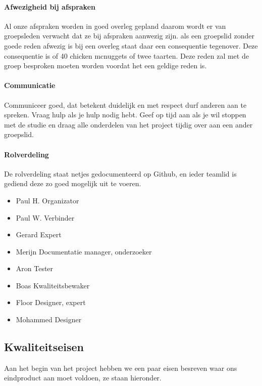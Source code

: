 \documentclass{article}
\begin{document}
\paragraph{Afwezigheid bij afspraken}

Al onze afspraken worden in goed overleg gepland daarom wordt er van groepsleden verwacht
dat ze bij afspraken aanwezig zijn. als een groepslid zonder goede reden afwezig is bij een
overleg staat daar een consequentie tegenover. Deze consequentie is of 40 chicken mcnuggets
of twee taarten. Deze reden zal met de groep besproken moeten worden voordat het een geldige reden is.

\paragraph{Communicatie}

Communiceer goed, dat betekent duidelijk en met respect durf anderen aan te spreken.
Vraag hulp als je hulp nodig hebt.
Geef op tijd aan als je wil stoppen met de studie en draag alle onderdelen van het project tijdig
over aan een ander groepslid.

\paragraph{Rolverdeling}

De rolverdeling staat netjes gedocumenteerd op Github, en ieder teamlid is gediend deze zo
goed mogelijk uit te voeren.
\begin{itemize}
\item Paul H. Organizator
\item Paul W. Verbinder
\item Gerard Expert
\item Merijn Documentatie manager, onderzoeker
\item Aron Tester
\item Boas Kwaliteitsbewaker
\item Floor Designer, expert
\item Mohammed Designer
\end{itemize}

\newpage

\subsection{Kwaliteitseisen}

Aan het begin van het project hebben we een paar eisen besreven waar ons eindproduct aan moet voldoen, ze staan hieronder.
\end{document}
